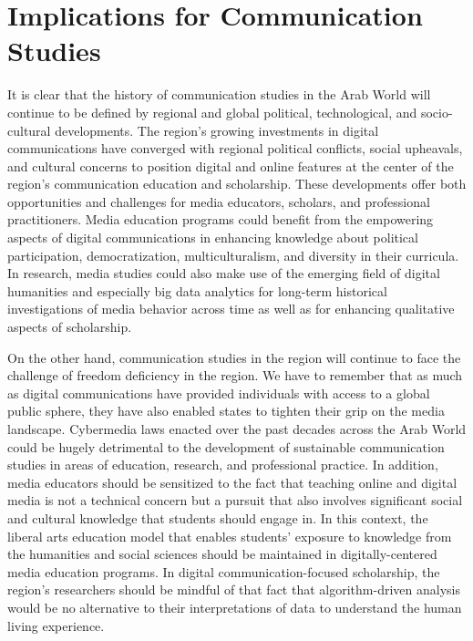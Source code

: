 \documentclass{tufte-handout}
\begin{document}
\hypertarget{implications-for-communication-studies}{%
\section{Implications for Communication
Studies}\label{implications-for-communication-studies}}

It is clear that the history of communication studies in the Arab World
will continue to be defined by regional and global political,
technological, and socio-cultural developments. The region's growing
investments in digital communications have converged with regional
political conflicts, social upheavals, and cultural concerns to position
digital and online features at the center of the region's communication
education and scholarship. These developments offer both opportunities
and challenges for media educators, scholars, and professional
practitioners. Media education programs could benefit from the
empowering aspects of digital communications in enhancing knowledge
about political participation, democratization, multiculturalism, and
diversity in their curricula. In research, media studies could also make
use of the emerging field of digital humanities and especially big data
analytics for long-term historical investigations of media behavior
across time as well as for enhancing qualitative aspects of scholarship.

On the other hand, communication studies in the region will continue to
face the challenge of freedom deficiency in the region. We have to
remember that as much as digital communications have provided
individuals with access to a global public sphere, they have also
enabled states to tighten their grip on the media landscape. Cybermedia
laws enacted over the past decades across the Arab World could be hugely
detrimental to the development of sustainable communication studies in
areas of education, research, and professional practice. In addition,
media educators should be sensitized to the fact that teaching online
and digital media is not a technical concern but a pursuit that also
involves significant social and cultural knowledge that students should
engage in. In this context, the liberal arts education model that
enables students' exposure to knowledge from the humanities and social
sciences should be maintained in digitally-centered media education
programs. In digital communication-focused scholarship, the region's
researchers should be mindful of that fact that algorithm-driven
analysis would be no alternative to their interpretations of data to
understand the human living experience.
\end{document}
